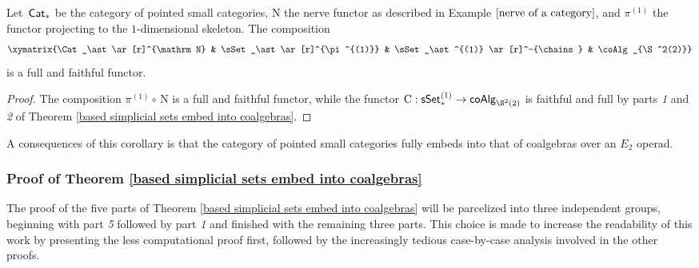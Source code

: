 \documentclass[thesis.tex]{subfiles}
\begin{document}
\begin{corollary}\label{CAT to coalgebras}
Let $\,\mathsf{Cat}_\ast$ be the category of pointed small categories, $\mathrm N$ the nerve functor as described in Example $\ref{nerve of a category}$, and $\pi^{(1)}$ the functor projecting to the $1$-dimensional skeleton. The composition
$$\xymatrix{\Cat_\ast\ar[r]^{\mathrm N} & \sSet_\ast \ar[r]^{\pi^{(1)}} & \sSet_\ast^{(1)} \ar[r]^-{\chains} & \coAlg_{\S^2(2)}}$$
is a full and faithful functor.
\begin{proof}
The composition $\pi^{(1)}\circ\,\mathrm N$ is a full and faithful functor, while the functor $\chains:\sSet_\ast^{(1)} \to \coAlg_{\S^2(2)}$ is faithful and full by parts \textit{1} and \textit{2} of Theorem \ref{based simplicial sets embed into coalgebras}.
\end{proof}
\end{corollary}

\begin{remark}
A consequences of this corollary is that the category of pointed small categories fully embeds into that of coalgebras over an $E_2$ operad.
\end{remark}

\subsubsection{Proof of Theorem \ref{based simplicial sets embed into coalgebras}}
The proof of the five parts of Theorem \ref{based simplicial sets embed into coalgebras} will be parcelized into three independent groups, beginning with part \textit{5} followed by part \textit{1} and finished with the remaining three parts. This choice is made to increase the readability of this work by presenting the less computational proof first, followed by the increasingly tedious case-by-case analysis involved in the other proofs.
\end{document}
